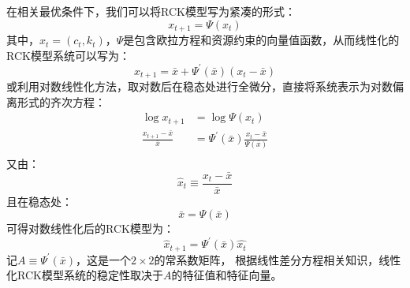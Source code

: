 在相关最优条件下，我们可以将RCK模型写为紧凑的形式：
\begin{equation*}
    x_{t+1} = \Psi(x_t)
\end{equation*}
其中，$x_t = (c_t,k_t)$，$\Psi$是包含欧拉方程和资源约束的向量值函数，从而线性化的RCK模型系统可以写为：
\begin{equation*}
    x_{t+1} = \bar{x} + \Psi^{\prime}(\bar{x})(x_t-\bar{x})
\end{equation*}
或利用对数线性化方法，取对数后在稳态处进行全微分，直接将系统表示为对数偏离形式的齐次方程：
\begin{equation*}
    \begin{aligned}
        \log x_{t+1} &= \log \Psi(x_t) \\
        \frac{x_{t+1}-\bar{x}}{\bar{x}} &= \Psi^{\prime}(\bar{x})\frac{x_t-\bar{x}}{\Psi(\bar{x})} \\
    \end{aligned}
\end{equation*}
又由：
\begin{equation*}
    \hat{x}_t \equiv \frac{x_t-\bar{x}}{\bar{x}}
\end{equation*}
且在稳态处：
\begin{equation*}
    \bar{x} = \Psi(\bar{x})
\end{equation*}
可得对数线性化后的RCK模型为：
\begin{equation}
    \hat{x}_{t+1}= \Psi^{\prime}(\bar{x})\hat{x_t}
\end{equation}
记$A \equiv \Psi^{\prime}(\bar{x})$，这是一个$2 \times 2$的常系数矩阵，
根据线性差分方程相关知识，线性化RCK模型系统的稳定性取决于$A$的特征值和特征向量。

